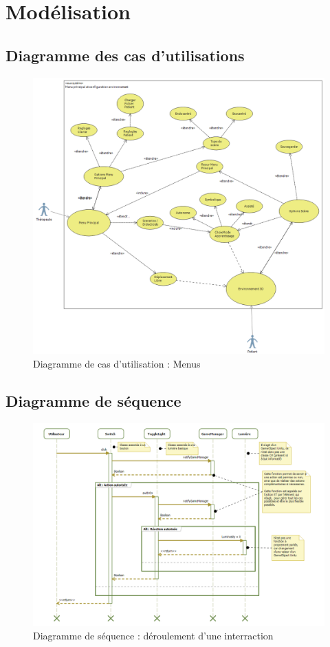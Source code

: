 \section{Modélisation}

\subsection{Diagramme des cas d’utilisations}
\begin{figure}[!h]
    \centering
    \includegraphics[width=\textwidth]{4-Conception/img/diagCasUsage.png}
    \caption{Diagramme de cas d'utilisation : Menus}
\end{figure}

\subsection{Diagramme de séquence}
\begin{figure}[!h]
    \centering
    \includegraphics[width=\textwidth]{4-Conception/img/diagSequenceLight.png}
    \caption{Diagramme de séquence : déroulement d'une interraction}
    \label{fig:sequence_diagram}
\end{figure}

